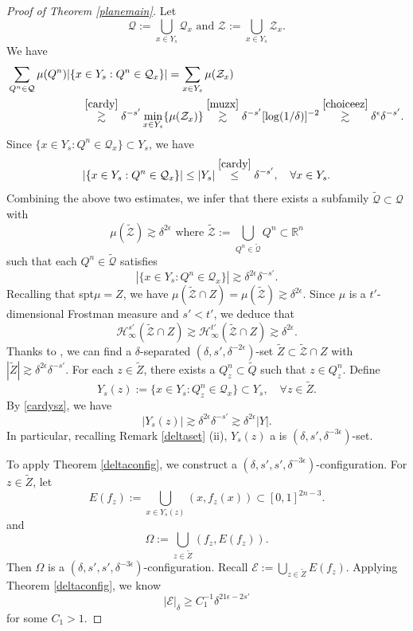 \documentclass[11pt,a4paper,reqno]{amsart}
\newcommand{\R}{\mathbb{R}}
\newcommand{\calH}{\mathcal{H}}
\newcommand{\calQ}{\mathcal{Q}}
\newcommand{\calZ}{\mathcal{Z}}
\newcommand{\1}{\mathbf{1}}
\numberwithin{equation}{section}
\theoremstyle{plain}
\theoremstyle{definition}
\theoremstyle{remark}
\begin{document}
\begin{proof}[Proof of Theorem \ref{planemain}]
Let
$$ \calQ:= \bigcup_{x \in Y_s}\calQ_x \mbox{ and } \calZ:= \bigcup_{x \in Y_s}\calZ_x.   $$
We have
\begin{align*}
  \sum_{Q^n \in \calQ}\mu(Q^n)|\{x & \in Y_s: Q^n \in \calQ_x\}| =  \sum_{x \in Y_s} \mu(\calZ_x)\\
  &\overset{\eqref{cardy}}{\gtrsim} \delta^{-s'} \min_{x \in Y_s}\{\mu(\calZ_x)\}
    \overset{\eqref{muzx}}{\gtrsim} \delta^{-s'}[\log(1/\delta)]^{-2}\overset{\eqref{choiceez}}{\gtrsim} \delta^{\epsilon}\delta^{-s'}.
\end{align*}
Since $\{x  \in Y_s: Q^n \in \calQ_x\} \subset Y_s$, we have
$$  |\{x  \in Y_s: Q^n \in \calQ_x\}| \le |Y_s| \overset{\eqref{cardy}} \le \delta^{-s'}, \quad \forall x \in Y_s.  $$
Combining the above two estimates, we infer that there exists a subfamily $\widetilde{\calQ} \subset \calQ$ with
$$ \mu(\widetilde{\calZ}) \gtrsim \delta^{2\epsilon} \mbox{ where $\widetilde{\calZ}:= \bigcup_{Q^n \in \widetilde{\calQ}}Q^n \subset \R^n$}$$
such that each $Q^n \in \widetilde{\calQ}$ satisfies
\begin{equation}\label{cardysz}
   |\{x  \in Y_s: Q^n \in \calQ_x\}| \gtrsim \delta^{2\epsilon}\delta^{-s'}.
\end{equation}
Recalling that spt$\mu=Z$, we have $\mu(\widetilde{\calZ} \cap Z)= \mu(\widetilde{\calZ}) \gtrsim \delta^{2\epsilon}$. Since $\mu$ is a $t'$-dimensional Frostman measure and $s' < t'$, we deduce that
$$\calH_\infty^{s'}(\widetilde{\calZ} \cap Z) \gtrsim \calH_\infty^{t'}(\widetilde{\calZ} \cap Z) \gtrsim  \delta^{2\epsilon}.$$
 Thanks to \cite[Lemma 2.7]{orponen2023hausdorff}, we can find a $\delta$-separated $(\delta,s',\delta^{-2\epsilon})$-set $\widetilde{Z} \subset \widetilde{\calZ} \cap Z$ with $|\widetilde{Z}| \gtrsim \delta^{2\epsilon} \delta^{-s'}$.
 For each $z \in \widetilde{Z}$, there exists a $Q^n_z \subset \widetilde{Q}$ such that $z \in Q^n_z$. Define
 $$ Y_{s}(z):= \{x  \in Y_s: Q^n_z \in \calQ_x\} \subset Y_s, \quad \forall z\in \widetilde{Z}. $$
 By \eqref{cardysz}, we have
 $$ |Y_{s}(z)|  \gtrsim  \delta^{2\epsilon}\delta^{-s'} \gtrsim \delta^{2\epsilon}|Y|. $$
 In particular, recalling Remark \ref{deltaset} (ii), $Y_{s}(z)$ a is $(\delta,s',\delta^{-3\epsilon})$-set.


 To apply Theorem \ref{deltaconfig}, we construct a $(\delta,s',s',\delta^{-3\epsilon})$-configuration.
 For $z \in \widetilde{Z}$, let
 $$   E(f_z):=\bigcup_{x \in Y_{s}(z)} (x, f_z(x))  \subset [0,1]^{2n-3}.$$
 and
 $$ \Omega:= \bigcup_{z \in \widetilde{Z}} (f_z,E(f_z)).$$
 Then $\Omega$ is a $(\delta,s',s',\delta^{-3\epsilon})$-configuration.
 Recall $\mathcal{E} := \bigcup_{z \in \widetilde{Z}} E(f_z)$. Applying Theorem \ref{deltaconfig}, we know
 \begin{equation}\label{lob1}
   |\mathcal{E}|_\delta  \ge C_1^{-1}\delta^{21\epsilon-2s'}
 \end{equation}
 for some $C_1>1$.


\end{proof}
\end{document}
